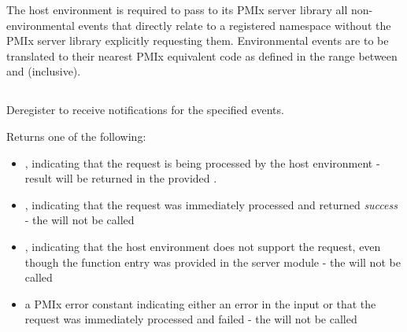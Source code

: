 \adviceimplend

\advicermstart
The host environment is required to pass to its \ac{PMIx} server library all non-environmental events that directly relate to a registered namespace without the \ac{PMIx} server library explicitly requesting them. Environmental events are to be translated to their nearest \ac{PMIx} equivalent code as defined in the range between  and  (inclusive).
\advicermend


\subsection{}

\summary

Deregister to receive notifications for the specified events.

\format


\begin{arglist}
\end{arglist}

Returns one of the following:

\begin{itemize}
    \item {}, indicating that the request is being processed by the host environment - result will be returned in the provided .
    \item {}, indicating that the request was immediately processed and returned \textit{success} - the  will not be called
    \item {}, indicating that the host environment does not support the request, even though the function entry was provided in the server module - the  will not be called
    \item a PMIx error constant indicating either an error in the input or that the request was immediately processed and failed - the  will not be called
\end{itemize}

